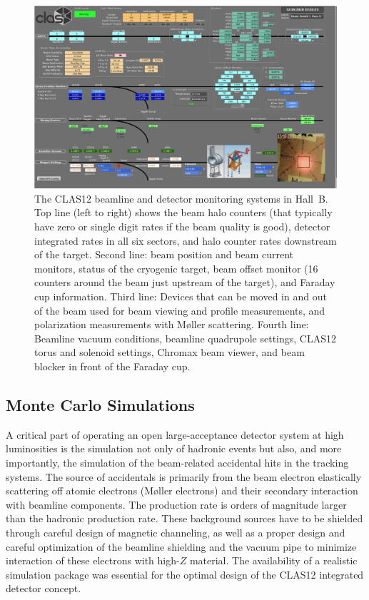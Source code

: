 \documentclass[final,3p,twocolumn]{elsarticle}
\begin{document}
\begin{figure}
\centerline{\includegraphics[width=1.0\columnwidth]{Beam-screen.png}}
\caption{The CLAS12 beamline and detector monitoring systems in Hall~B. Top line (left to right) shows the beam halo
  counters (that typically have zero or single digit rates if the beam quality is good), detector integrated rates in all six
  sectors, and halo counter rates downstream of the target. Second line: beam position and beam current monitors, status
  of the cryogenic target, beam offset monitor (16 counters around the beam just upstream of the target), and Faraday
  cup information. Third line: Devices that can be moved in and out of the beam used for beam viewing and profile
  measurements, and polarization measurements with M{\o}ller scattering. Fourth line: Beamline vacuum conditions,
  beamline quadrupole settings, CLAS12 torus and solenoid settings, Chromax beam viewer, and beam blocker in front of
  the Faraday cup.} 
\label{beam-monitoring}
\end{figure}

\subsection{Monte Carlo Simulations} 

A critical part of operating an open large-acceptance detector system at high luminosities is the simulation not
only of hadronic events but also, and more importantly, the simulation of the beam-related accidental hits in the
tracking systems. The source of accidentals is primarily from the beam electron elastically scattering off atomic
electrons (M{\o}ller electrons) and their secondary interaction with beamline components. The production rate
is orders of magnitude larger than the hadronic production rate. These background sources have to be shielded
through careful design of magnetic channeling, as well as a proper design and careful optimization  of the beamline 
shielding and the vacuum pipe to minimize interaction of these electrons with high-$Z$ material. The availability of
a realistic simulation package was essential for the optimal design of the CLAS12 integrated detector concept.
\end{document}
